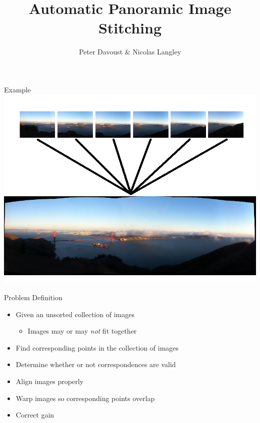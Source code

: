 \documentclass{beamer}
\author{Peter Davoust \& Nicolas Langley}
\title{Automatic Panoramic Image Stitching}
\begin{document}
\begin{frame}[plain]
	\titlepage
\end{frame}

\begin{frame}{Example}
	\includegraphics[width=\textwidth]{StitchExample.png}
\end{frame}

\begin{frame}{Problem Definition}
	\begin{itemize}
		\item Given an unsorted collection of images
		\begin{itemize}
			\item Images may or may \emph{not} fit together
		\end{itemize}
		\item Find corresponding points in the collection of images
		\item Determine whether or not correspondences are valid
		\item Align images properly
		\item Warp images so corresponding points overlap
		\item Correct gain
	\end{itemize}
\end{frame}
\end{document}
